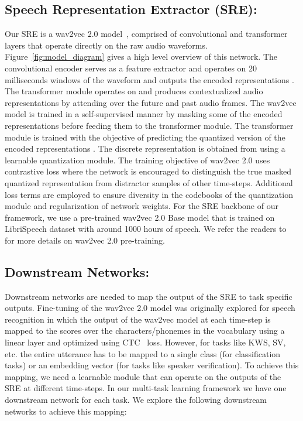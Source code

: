 \documentclass{article}
\begin{document}
\subsection{Speech Representation Extractor (SRE):}
Our SRE is a wav2vec 2.0 model~\cite{wav2vec2}, comprised of convolutional and transformer layers that operate directly on the raw audio waveforms. Figure~\ref{fig:model_diagram} gives a high level overview of this network. The convolutional encoder serves as a feature extractor and operates on 20 milliseconds windows of the waveform and outputs the encoded representations . The transformer module operates on  and produces contextualized audio representations  by attending over the future and past audio frames. 
The wav2vec model is trained in a self-supervised manner by masking some of the encoded representations  before feeding them to the transformer module. The transformer module is trained with the objective of predicting the quantized version  of the encoded representations . The discrete representation  is obtained from  using a learnable quantization module. The training objective of wav2vec 2.0 uses contrastive loss where the network is encouraged to distinguish the true masked quantized representation from distractor samples of other time-steps. Additional loss terms are employed to ensure diversity in the codebooks of the quantization module and  regularization of network weights.  
For the SRE backbone of our framework, we use a pre-trained wav2vec 2.0 Base model that is trained on LibriSpeech dataset with around 1000 hours of speech. We refer the readers to~\cite{wav2vec2} for more details on wav2vec 2.0 pre-training. 


\vspace{-3mm}
\subsection{Downstream Networks:}
Downstream networks are needed to map the output of the SRE to task specific outputs. Fine-tuning of the wav2vec 2.0 model was originally explored for speech recognition in which the output of the wav2vec model at each time-step is mapped to the scores over the characters/phonemes in the vocabulary using a linear layer and optimized using CTC~\cite{graves2006connectionist} loss. 
However, for tasks like KWS, SV, etc. the entire utterance has to be mapped to a single class (for classification tasks) or an embedding vector (for tasks like speaker verification). To achieve this mapping, we need a learnable module that can operate on the outputs of the SRE at different time-steps. 
In our multi-task learning framework we have one downstream network for each task.
We explore the following downstream networks to achieve this mapping:
\end{document}
